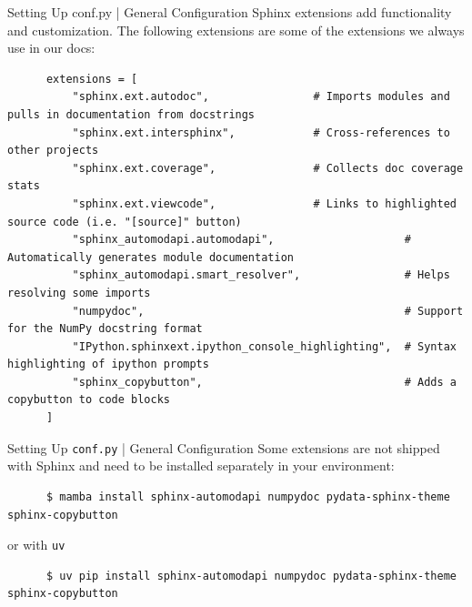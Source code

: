 \begin{darkframe}[fragile]{Setting Up conf.py | General Configuration}
  Sphinx extensions add functionality and customization. The following extensions
  are some of the extensions we always use in our docs:\\[0.25\baselineskip]
    \small
    \begin{verbatim}
      extensions = [
          "sphinx.ext.autodoc",                # Imports modules and pulls in documentation from docstrings
          "sphinx.ext.intersphinx",            # Cross-references to other projects
          "sphinx.ext.coverage",               # Collects doc coverage stats
          "sphinx.ext.viewcode",               # Links to highlighted source code (i.e. "[source]" button)
          "sphinx_automodapi.automodapi",                    # Automatically generates module documentation
          "sphinx_automodapi.smart_resolver",                # Helps resolving some imports
          "numpydoc",                                        # Support for the NumPy docstring format
          "IPython.sphinxext.ipython_console_highlighting",  # Syntax highlighting of ipython prompts
          "sphinx_copybutton",                               # Adds a copybutton to code blocks
      ]
    \end{verbatim}
\end{darkframe}

{
\begin{frame}[fragile]{Setting Up \texttt{conf.py} | General Configuration}
    Some extensions are not shipped with Sphinx and need to be installed separately in your environment:
    \begin{verbatim}
      $ mamba install sphinx-automodapi numpydoc pydata-sphinx-theme sphinx-copybutton
    \end{verbatim}
    or with \texttt{uv}
    \begin{verbatim}
      $ uv pip install sphinx-automodapi numpydoc pydata-sphinx-theme sphinx-copybutton
    \end{verbatim}
\end{frame}
}

